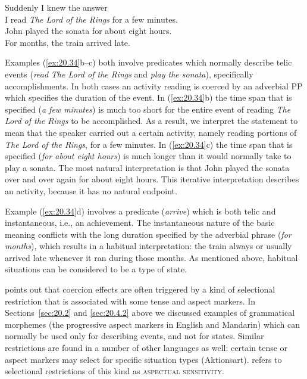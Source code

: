 \ea \label{ex:20.34}
\ea  Suddenly I knew the answer\\
\ex I read \textit{The Lord of the Rings} for a few minutes.\\
\ex John played the sonata for about eight hours.\\
\ex For months, the train arrived late.
                       \z
\z


Examples (\ref{ex:20.34}b--c) both involve predicates which normally describe telic events (\textit{read} \textit{The Lord of the Rings} and \textit{play the sonata}), specifically accomplishments. In both cases an activity reading is coerced by an adverbial PP which specifies the duration of the event. In (\ref{ex:20.34}b) the time span that is specified (\textit{a few minutes}) is much too short for the entire event of reading \textit{The Lord of the Rings} to be accomplished. As a result, we interpret the statement to mean that the speaker carried out a certain activity, namely reading portions of \textit{The Lord of the Rings}, for a few minutes. In (\ref{ex:20.34}c) the time span that is specified (\textit{for about eight hours}) is much longer than it would normally take to play a sonata. The most natural interpretation is that John played the sonata over and over again for about eight hours. This iterative interpretation describes an activity, because it has no natural endpoint.



Example (\ref{ex:20.34}d) involves a predicate (\textit{arrive}) which is both telic and instantaneous, i.e., an achievement. The instantaneous nature of the basic meaning conflicts with the long duration specified by the adverbial phrase (\textit{for months}), which results in a habitual interpretation: the train always or usually arrived late whenever it ran during those months. As mentioned above, habitual situations can be considered to be a type of state.



 points out that coercion effects are often triggered by a kind of selectional restriction that is associated with some tense and aspect markers. In Sections~\ref{sec:20.2} and \ref{sec:20.4.2} above we discussed examples of grammatical morphemes (the progressive aspect markers in English and Mandarin) which can normally be used only for describing events, and not for states. Similar restrictions are found in a number of other languages as well: certain tense or aspect markers may select for specific situation types (Aktionsart).  refers to selectional restrictions of this kind as \textsc{aspectual sensitivity}.




